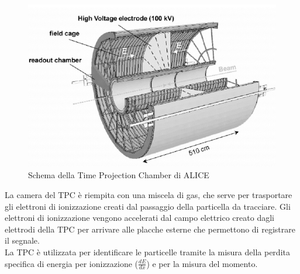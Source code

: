      \begin{figure}[htbp]
        \centering
        \includegraphics[width=0.7\linewidth]{ALICE/ALICE-TPC-detector.png}
        \caption{Schema della Time Projection Chamber di ALICE}
        \label{fig:TPCcomplex}
    \end{figure}
    
    La camera del TPC è riempita con una miscela di gas, che serve per trasportare gli elettroni di ionizzazione creati dal passaggio della particella da tracciare. Gli elettroni di ionizzazione vengono accelerati dal campo elettrico creato dagli elettrodi della TPC per arrivare alle placche esterne che permettono di registrare il segnale. \cite{Collaboration_2008_ALICE}
    \\La TPC è utilizzata per identificare le particelle tramite la misura della perdita specifica di energia per ionizzazione ($\frac{dE}{dx}$) e per la misura del momento. 
    
    
